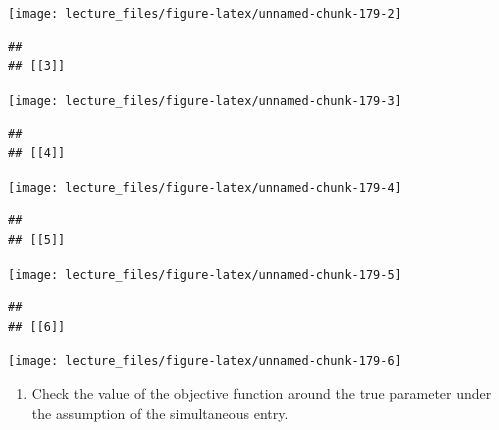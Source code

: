 \documentclass[
]{book}
\providecommand{\tightlist}{%
  \setlength{\itemsep}{0pt}\setlength{\parskip}{0pt}}
\begin{document}
\begin{center}\texttt{[image: lecture\_files/figure-latex/unnamed-chunk-179-2]} \end{center}

\begin{verbatim}
## 
## [[3]]
\end{verbatim}

\begin{center}\texttt{[image: lecture\_files/figure-latex/unnamed-chunk-179-3]} \end{center}

\begin{verbatim}
## 
## [[4]]
\end{verbatim}

\begin{center}\texttt{[image: lecture\_files/figure-latex/unnamed-chunk-179-4]} \end{center}

\begin{verbatim}
## 
## [[5]]
\end{verbatim}

\begin{center}\texttt{[image: lecture\_files/figure-latex/unnamed-chunk-179-5]} \end{center}

\begin{verbatim}
## 
## [[6]]
\end{verbatim}

\begin{center}\texttt{[image: lecture\_files/figure-latex/unnamed-chunk-179-6]} \end{center}

\begin{enumerate}
\def\labelenumi{\arabic{enumi}.}
\setcounter{enumi}{4}
\tightlist
\item
  Check the value of the objective function around the true parameter under the assumption of the simultaneous entry.
\end{enumerate}
\end{document}
